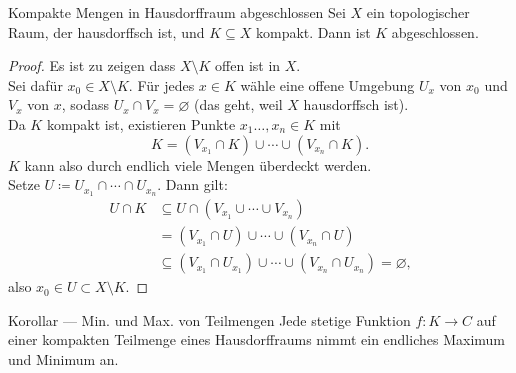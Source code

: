 \begin{lemma}{Kompakte Mengen in Hausdorffraum abgeschlossen}
  Sei $ X $ ein topologischer Raum, der hausdorffsch ist, und $ K \subseteq X $ kompakt. Dann ist $ K $ abgeschlossen.
  \begin{proof}
    Es ist zu zeigen dass $ X \setminus K $ offen ist in $ X $. \\
    Sei dafür $ x_0 \in X \setminus K $. Für jedes $ x \in K $ wähle eine offene Umgebung $ U_x $ von $ x_0 $ und $ V_x $ von $ x $, sodass $ U_x \cap V_x = \varnothing $ (das geht, weil $ X $ hausdorffsch ist). \\
    Da $ K $ kompakt ist, existieren Punkte $ x_1 \dots, x_n \in K $ mit
    \begin{equation*}
      K = (V_{x_1} \cap K) \cup \cdots \cup (V_{x_n} \cap K)\text{.}
    \end{equation*}
    $ K $ kann also durch endlich viele Mengen überdeckt werden. \\
    Setze $ U \coloneqq U_{x_1} \cap \cdots \cap U_{x_n} $. Dann gilt:
    \begin{align*}
      U \cap K &\subseteq U \cap (V_{x_1} \cup \cdots \cup V_{x_n}) \\
       &= (V_{x_1} \cap U) \cup \cdots \cup (V_{x_n} \cap U) \\
       &\subseteq (V_{x_1} \cap U_{x_1}) \cup \cdots \cup (V_{x_n} \cap U_{x_n}) = \varnothing\text{,}
    \end{align*}
    also $ x_0 \in U \subset X \setminus K $.
  \end{proof}
\end{lemma}

\begin{bla}{Korollar --- Min. und Max. von Teilmengen}
  Jede stetige Funktion $ f : K \to C $ auf einer kompakten Teilmenge eines Hausdorffraums nimmt ein endliches Maximum und Minimum an.
\end{bla}

